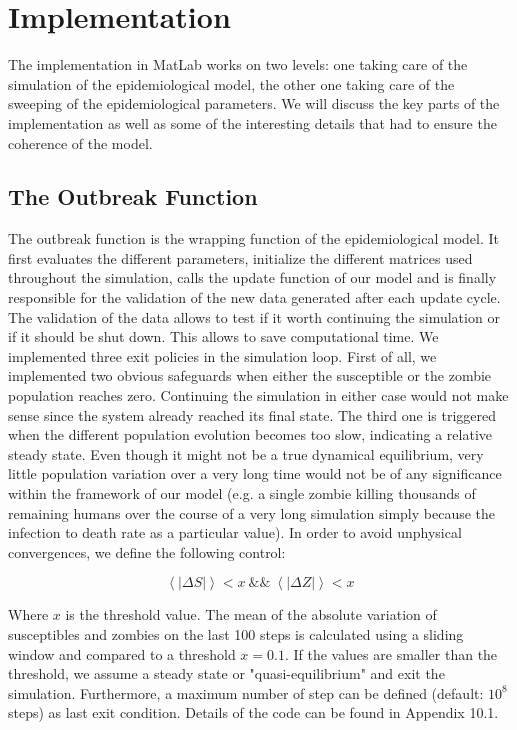\documentclass[11pt]{article} %
\begin{document}
\newpage
\section{Implementation}\indent

The implementation in MatLab works on two levels: one taking care of the simulation of the epidemiological model, the other one taking care of the sweeping of the epidemiological parameters. We will discuss the key parts of the implementation as well as some of the interesting details that had to ensure the coherence of the model.


\subsection{The Outbreak Function}\indent

The outbreak function is the wrapping function of the epidemiological model. It first evaluates the different parameters, initialize the different matrices used throughout the simulation, calls the update function of our model and is finally responsible for the validation of the new data generated after each update cycle. The validation of the data allows to test if it worth continuing the simulation or if it should be shut down. This allows to save computational time. We implemented three exit policies in the simulation loop. First of all, we implemented two obvious safeguards when either the susceptible or the zombie population reaches zero. Continuing the simulation in either case would not make sense since the system already reached its final state. The third one is triggered when the different population evolution becomes too slow, indicating a relative steady state. Even though it might not be a true dynamical equilibrium, very little population variation over a very long time would not be of any significance within the framework of our model (e.g. a single zombie killing thousands of remaining humans over the course of a very long simulation simply because the infection to death rate as a particular value). In order to avoid unphysical convergences, we define the following control:

\begin{equation} \label{eq:outbreakequilibrium}
\left\langle \left| \Delta S \right| \right\rangle < x\ \&\&\ \left\langle\left|\Delta Z \right| \right\rangle < x
\end{equation}

Where $x$ is the threshold value. The mean of the absolute variation of susceptibles and zombies on the last 100 steps is calculated using a sliding window and compared to a threshold $x = 0.1$. If the values are smaller than the threshold, we assume a steady state or "quasi-equilibrium" and exit the simulation. Furthermore, a maximum number of step can be defined (default: $10^8$ steps) as last exit condition. Details of the code can be found in Appendix 10.1.
\end{document}
